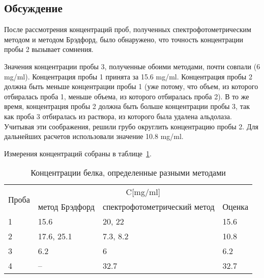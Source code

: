 \subsection{Обсуждение}
После рассмотрения концентраций проб, полученных спектрофотометрическим методом
и методом Брэдфорд, было обнаружено, что точность концентрации пробы 2 вызывает
сомнения.

Значения концентрации пробы 3, полученные обоими методами, почти совпали (6 mg/ml).
Концентрация пробы 1 принята за 15.6 mg/ml.
Концентрация пробы 2 должна быть меньше концентрации пробы 1
(уже потому, что объем, из которого отбиралась проба 1,
меньше объема, из которого отбиралась проба 2).
В то же время, концентрация пробы 2 должна быть больше концентрации пробы 3,
так как проба 3 отбиралась из раствора, из которого была удалена альдолаза.
Учитывая эти соображения, решили грубо округлить концентрацию пробы 2.
Для дальнейших расчетов использовали значение 10.8 mg/ml.

Измерения концентраций собраны в таблице~\ref{table-conc}.

\begin{table}[htbp]
\caption{Концентрации белка, определенные разными методами}
\begin{tabular}{|l|l|l|l|}
\hline
\multirow{2}{*}{Проба} & \multicolumn{3}{|c|}{C[mg/ml]} \\
\cline{2-4}
& метод Брэдфорд & спектрофотометрический метод & Оценка \\
\hline
1 & 15.6 & 20, 22 & 15.6 \\
\hline
2 & 17.6, 25.1 & 7.3, 8.2 & 10.8 \\
\hline
3 & 6.2 & 6 & 6.2 \\
\hline
4 & -- & 32.7 & 32.7 \\
\hline
\end{tabular}
\label{table-conc}
\end{table}

